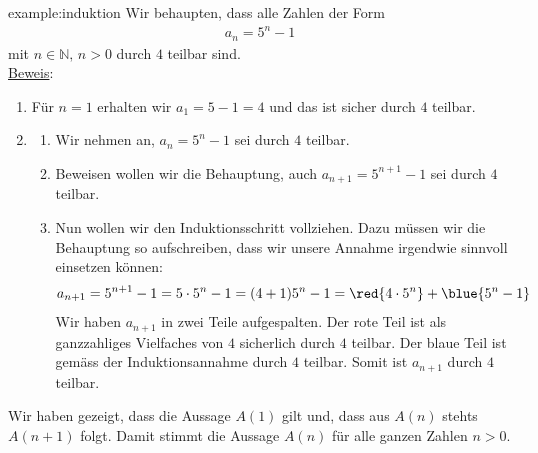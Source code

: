 \begin{example}{example:induktion}
	Wir behaupten, dass alle Zahlen der Form
	\begin{align*}
		a_n = 5^n -1
	\end{align*}
	mit $n\in\mathbb{N},\, n > 0$ durch $4$ teilbar sind.\\
	\underline{Beweis}:
	\begin{enumerate}
		\item Für $n = 1$ erhalten wir $a_1 = 5-1 = 4$ und das ist sicher durch $4$ teilbar.
		\item \begin{enumerate}
			      \item Wir nehmen an, $a_n = 5^n - 1$ sei durch $4$ teilbar.
			      \item Beweisen wollen wir die Behauptung, auch $a_{n+1} = 5^{n+1} - 1$ sei durch $4$ teilbar.
			      \item Nun wollen wir den Induktionsschritt vollziehen. Dazu müssen wir die Behauptung so aufschreiben, dass wir unsere Annahme irgendwie sinnvoll einsetzen können:
			            \begin{align*}
				            a_{n+1} = 5^{n+1} - 1 = 5\cdot 5^n -1 = (4+1)5^n -1 = \red{4\cdot 5^n} + \blue{5^n -1}
			            \end{align*}
			            Wir haben $a_{n+1}$ in zwei Teile aufgespalten. Der rote Teil ist als ganzzahliges Vielfaches von $4$ sicherlich durch $4$ teilbar. Der blaue Teil ist gemäss der Induktionsannahme durch $4$ teilbar. Somit ist $a_{n+1}$ durch $4$ teilbar.
		      \end{enumerate}
	\end{enumerate}
	Wir haben gezeigt, dass die Aussage $A(1)$ gilt und, dass aus $A(n)$ stehts $A(n+1)$ folgt. Damit stimmt die Aussage $A(n)$ für alle ganzen Zahlen $n > 0$.
\end{example}

